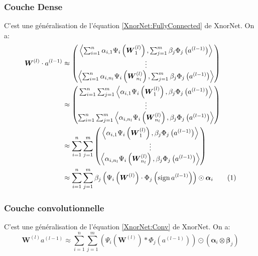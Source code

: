 \subsubsection{Couche Dense}
C'est une généralisation de l'équation \eqref{XnorNet:FullyConnected} de XnorNet.
\newline On a:
\begin{align*}
	\boldsymbol{W}^{(l)}\cdot a^{(l-1)} &\approx  \begin{pmatrix}
		 \left\langle \sum_{i=1}^n \alpha_{i,1}\Psi_i \left(\boldsymbol{W}_1^{(l)}\right),\sum_{j=1}^m \beta_j\Phi_j \left( a^{(l-1)}\right) \right\rangle  \\
		\vdots  \\
		\left\langle \sum_{i=1}^n \alpha_{i,n_l}\Psi_i \left(\boldsymbol{W}_{n_l}^{(l)}\right),\sum_{j=1}^m  \beta_j\Phi_j\left( a^{(l-1)}\right) \right\rangle 
	\end{pmatrix} \\
	&\approx  \begin{pmatrix}
		 \sum_{i=1}^n \sum_{j=1}^m \left \langle \alpha_{i,1}  \Psi_i \left(\boldsymbol{W}_1^{(l)}\right), \beta_j \Phi_j \left( a^{(l-1)}\right) \right\rangle  \\
		\vdots  \\
		\sum_{i=1}^n \sum_{j=1}^m \left \langle \alpha_{i,n_l}  \Psi_i \left(\boldsymbol{W}_{n_l}^{(l)}\right), \beta_j \Phi_j \left( a^{(l-1)}\right) \right\rangle 
	\end{pmatrix} \\
	&\approx   \sum_{i=1}^n \sum_{j=1}^m  \begin{pmatrix}
		\left \langle \alpha_{i,1}  \Psi_i \left(\boldsymbol{W}_1^{(l)}\right), \beta_j \Phi_j \left( a^{(l-1)}\right) \right\rangle  \\
		\vdots  \\
		\left \langle \alpha_{i,n_l}  \Psi_i \left(\boldsymbol{W}_{n_l}^{(l)}\right), \beta_j \Phi_j \left( a^{(l-1)}\right) \right\rangle 
	\end{pmatrix} \\
	&\approx \sum_{i=1}^n\sum_{j=1}^m \beta_j  \left(\Psi_i \left(\boldsymbol{W}^{(l)}\right) \cdot \Phi_j\left(\sign a^{(l-1)}\right)\right) \odot \boldsymbol{\alpha}_i \addtocounter{equation}{1}\tag{\theequation} \label{ABCNet:FullyConnected}
\end{align*}
\subsubsection{Couche convolutionnelle}
C'est une généralisation de l'équation \eqref{XnorNet:Conv} de XnorNet\cite{XnorNetPaper}.
\newline On a:
\begin{equation} \label{ABCNet:Conv}
	\boldsymbol{W}^{(l)}a^{(l-1)} \approx \sum_{i=1}^n\sum_{j=1}^m\left(\Psi_i\left( \boldsymbol{W}^{(l)}\right) * \Phi_j\left( a^{(l-1)}\right)\right) \odot \left(\boldsymbol{\alpha}_i \otimes \boldsymbol{\beta}_j\right) 
\end{equation}

